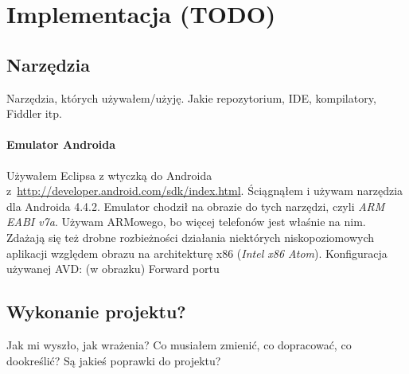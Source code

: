 \chapter{Implementacja (TODO)}

\section{Narzędzia}
Narzędzia, których używałem/użyję. Jakie repozytorium, IDE, kompilatory, Fiddler itp.

\subsubsection{Emulator Androida}
Używałem Eclipsa z wtyczką do Androida z~\url{http://developer.android.com/sdk/index.html}.
Ściągnąłem i używam narzędzia dla Androida 4.4.2.
Emulator chodził na obrazie do tych narzędzi, czyli \emph{ARM EABI v7a}. Używam ARMowego, bo więcej telefonów jest właśnie na nim. Zdażają się też drobne rozbieżności działania niektórych niskopoziomowych aplikacji względem obrazu na architekturę x86 (\emph{Intel x86 Atom}).
Konfiguracja używanej AVD: (w obrazku)
Forward portu

\section{Wykonanie projektu?}
Jak mi wyszło, jak wrażenia? Co musiałem zmienić, co dopracować, co dookreślić? Są jakieś poprawki do projektu?